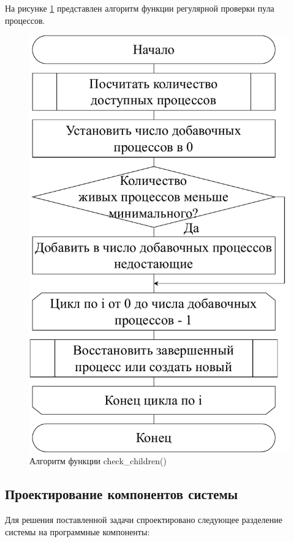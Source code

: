 На рисунке \ref{scheme-check-children} представлен алгоритм функции регулярной проверки пула процессов.

\begin{figure}[H]
	\centering
	\includegraphics[scale=0.6]{img/check_children.pdf}
	\caption{Алгоритм функции check\_children()}
	\label{scheme-check-children}
\end{figure}

\subsection{Проектирование компонентов системы}

Для решения поставленной задачи спроектировано следующее разделение системы на программные компоненты:

